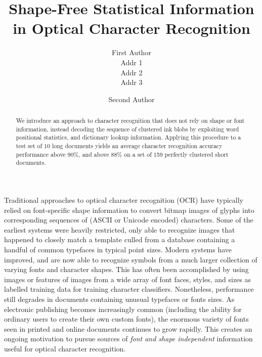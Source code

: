 \documentclass[times, 10pt,twocolumn]{article}
\begin{document}
\title{Shape-Free Statistical Information in Optical Character Recognition}

\author{First Author\\
Addr 1\\
Addr 2\\
Addr 3\\
\and
Second Author\\
}


\maketitle
\thispagestyle{empty}


\begin{abstract}
We introduce an approach to character recognition that does not rely on shape 
or font information, instead decoding the sequence of clustered ink blobs by
exploiting word positional statistics, and dictionary lookup information.
Applying this procedure to a test set of 10 long documents yields an average
character recognition accuracy performance above 90\%, and above 88\% on a set 
of 159 perfectly clustered short documents.
\end{abstract}



Traditional approaches to optical character recognition (OCR) have typically
relied on font-specific shape information to convert bitmap
images of glyphs into corresponding sequences of (ASCII or Unicode encoded)
characters.  Some of the earliest systems were heavily restricted, only
able to recognize images that happened to closely match a template culled from
a database containing a handful of common typefaces in typical point
sizes.  Modern systems have improved, and are now able to recognize
symbols from a much larger collection of varying fonts and character shapes.  
This has often been accomplished by using images or features of images from a 
wide array of font faces, styles, and sizes as labelled training data for 
training character classifiers.  Nonetheless, performance still degrades
in documents containing unusual typefaces or fonts sizes.  
As electronic publishing becomes increasingly common (including the
ability for ordinary users to create their own custom fonts), the enormous
variety of fonts seen in printed and online documents continues to grow rapidly.
This creates an ongoing motivation to pursue sources of {\em font and shape
independent} information useful for optical character recognition.
\end{document}
